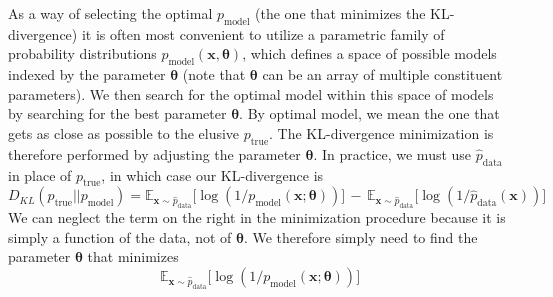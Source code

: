 \documentclass{article}
\begin{document}
As a way of selecting the optimal $p_{\mathrm{model}}$ (the one that minimizes the KL-divergence) it is often most convenient to utilize a parametric family of probability distributions $p_{\mathrm{model}}(\textbf{x} , \boldsymbol{\theta})$, which defines a space of possible models indexed by the parameter $\boldsymbol{\theta}$ (note that $\boldsymbol{\theta}$ can be an array of multiple constituent parameters). We then search for the optimal model within this space of models by searching for the best parameter $\boldsymbol{\theta}$. By optimal model, we mean the one that gets as close as possible to the elusive $p_{\mathrm{true}}$. The KL-divergence minimization is therefore performed by adjusting the parameter $\boldsymbol{\theta}$. In practice, we must use $\hat{p}_{\mathrm{data}}$ in place of $p_{\mathrm{true}}$, in which case our KL-divergence is
\begin{equation*}
D_{KL}(p_{\mathrm{true}} || p_{\mathrm{model}}) =    \mathbb{E}_{\textbf{x} \sim \hat{p}_{\mathrm{data}}} \bigr[ \log (1/p_{\mathrm{model}}(\textbf{x}; \boldsymbol{\theta})) \bigr] \, - \, \mathbb{E}_{\textbf{x} \sim \hat{p}_{\mathrm{data}}} \bigr[ \log (1/\hat{p}_{\mathrm{data}}(\textbf{x})) \bigr] 
\end{equation*}
We can neglect the term on the right in the minimization procedure because it is simply a function of the data, not of $\boldsymbol{\theta}$. We therefore simply need to find the parameter $\boldsymbol{\theta}$ that minimizes 
\begin{equation*}
\mathbb{E}_{\textbf{x} \sim \hat{p}_{\mathrm{data}}} \bigr[ \log (1/p_{\mathrm{model}}(\textbf{x}; \boldsymbol{\theta})) \bigr]
\end{equation*}
\end{document}

